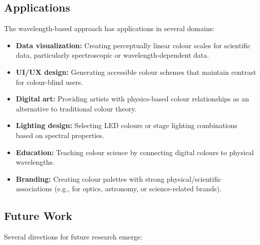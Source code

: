 \documentclass[12pt,a4paper]{article}
\begin{document}
\subsection{Applications}

The wavelength-based approach has applications in several domains:

\begin{itemize}
\item \textbf{Data visualization:} Creating perceptually linear colour scales for scientific data, particularly spectroscopic or wavelength-dependent data.

\item \textbf{UI/UX design:} Generating accessible colour schemes that maintain contrast for colour-blind users.

\item \textbf{Digital art:} Providing artists with physics-based colour relationships as an alternative to traditional colour theory.

\item \textbf{Lighting design:} Selecting LED colours or stage lighting combinations based on spectral properties.

\item \textbf{Education:} Teaching colour science by connecting digital colours to physical wavelengths.

\item \textbf{Branding:} Creating colour palettes with strong physical/scientific associations (e.g., for optics, astronomy, or science-related brands).
\end{itemize}

\subsection{Future Work}

Several directions for future research emerge:
\end{document}

